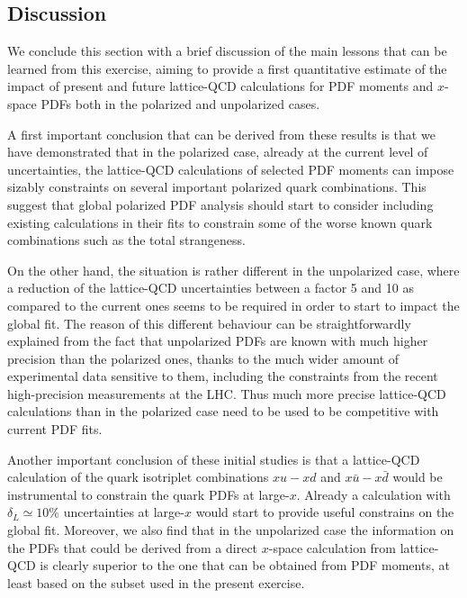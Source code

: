 \subsection{Discussion}

We conclude this section with a brief discussion of the main lessons that
can be learned from this exercise, aiming to provide a first quantitative estimate
of the impact of present and future lattice-QCD calculations for PDF moments
and $x$-space PDFs both in the polarized and unpolarized cases.

A first important conclusion that can be derived from these
results is that we have demonstrated that in the polarized case,
already at the current level of uncertainties, the lattice-QCD calculations of
selected PDF moments can impose sizably constraints on several
important polarized quark combinations.
%
This suggest that global polarized PDF analysis should start to consider
including existing calculations in their fits to constrain some
of the worse known quark combinations such as the total strangeness.

On the other hand, the situation is rather different in the unpolarized case,
where a reduction of the lattice-QCD uncertainties between a factor 5 and 10 as compared
to the current ones seems to be required in order to start to impact the global
fit.
%
The reason of this different behaviour can be straightforwardly explained from
the fact that unpolarized PDFs are known with much higher precision than the polarized
ones, thanks to the much wider amount of experimental data sensitive to them,
including the constraints from the recent high-precision measurements at the
LHC.
%
Thus much more precise lattice-QCD calculations than in the polarized case
need to be used to be competitive with current PDF fits.

Another important conclusion of these initial studies is that
a lattice-QCD calculation of the quark isotriplet combinations
$xu-xd$ and $x\bar{u}-x\bar{d}$ would be instrumental to constrain
the quark PDFs at large-$x$.
%
Already a calculation with $\delta_L\simeq 10\%$ uncertainties at large-$x$ would
start to provide useful constrains on the global fit.
%
Moreover, we also find that in the unpolarized case the information on the
PDFs that could be derived from a direct $x$-space calculation
from lattice-QCD is clearly superior to the one that can be obtained
from PDF moments, at least based on the subset used in the present
exercise.


